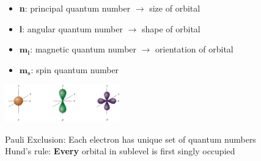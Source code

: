     \vspace*{0.3em}
    
    \begin{itemize}
        \itemsep0em
        \item \textbf{n}: principal quantum number $\rightarrow$ size of orbital
        \item \textbf{l}: angular quantum number $\rightarrow$ shape of orbital
        \item $\boldsymbol{m_l}$: magnetic quantum number $\rightarrow$ orientation of orbital
        \item $\boldsymbol{m_s}$: spin quantum number
    \end{itemize}
    \centerline{\includegraphics[width=50mm]{src/2_Atoms/images/orbital_shapes.png}}
    
    Pauli Exclusion: Each electron has unique set of quantum numbers\\
    Hund's rule: \textbf{Every} orbital in sublevel is first singly occupied